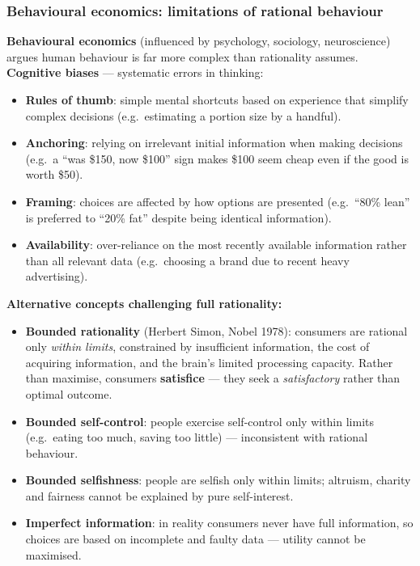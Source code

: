 \documentclass[a4paper,12pt]{article}
\begin{document}
\subsubsection*{Behavioural economics: limitations of rational behaviour}
\textbf{Behavioural economics} (influenced by psychology, sociology, neuroscience) argues human behaviour is far more complex than rationality assumes.\\
\textbf{Cognitive biases} --- systematic errors in thinking:
\begin{itemize}
  \item \textbf{Rules of thumb}: simple mental shortcuts based on experience that simplify complex decisions (e.g.\ estimating a portion size by a handful).
  \item \textbf{Anchoring}: relying on irrelevant initial information when making decisions (e.g.\ a ``was \$150, now \$100'' sign makes \$100 seem cheap even if the good is worth \$50).
  \item \textbf{Framing}: choices are affected by how options are presented (e.g.\ ``80\% lean'' is preferred to ``20\% fat'' despite being identical information).
  \item \textbf{Availability}: over-reliance on the most recently available information rather than all relevant data (e.g.\ choosing a brand due to recent heavy advertising).
\end{itemize}
\textbf{Alternative concepts challenging full rationality:}
\begin{itemize}
  \item \textbf{Bounded rationality} (Herbert Simon, Nobel 1978): consumers are rational only \textit{within limits}, constrained by insufficient information, the cost of acquiring information, and the brain's limited processing capacity. Rather than maximise, consumers \textbf{satisfice} --- they seek a \textit{satisfactory} rather than optimal outcome.
  \item \textbf{Bounded self-control}: people exercise self-control only within limits (e.g.\ eating too much, saving too little) --- inconsistent with rational behaviour.
  \item \textbf{Bounded selfishness}: people are selfish only within limits; altruism, charity and fairness cannot be explained by pure self-interest.
  \item \textbf{Imperfect information}: in reality consumers never have full information, so choices are based on incomplete and faulty data --- utility cannot be maximised.
\end{itemize}
\end{document}
